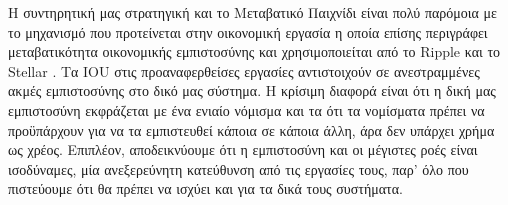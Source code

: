   Η συντηρητική μας στρατηγική και το Μεταβατικό Παιχνίδι είναι πολύ παρόμοια με το μηχανισμό που προτείνεται στην οικονομική
  εργασία \cite{iou} η οποία επίσης περιγράφει μεταβατικότητα οικονομικής εμπιστοσύνης και χρησιμοποιείται από το
  \textlatin{Ripple} \cite{ripple} και το \textlatin{Stellar} \cite{stellar}. Τα \textlatin{IOU} στις προαναφερθείσες εργασίες
  αντιστοιχούν σε ανεστραμμένες ακμές εμπιστοσύνης στο δικό μας σύστημα. Η κρίσιμη διαφορά είναι ότι η δική μας εμπιστοσύνη
  εκφράζεται με ένα ενιαίο νόμισμα και τα ότι τα νομίσματα πρέπει να προϋπάρχουν για να τα εμπιστευθεί κάποια σε κάποια άλλη,
  άρα δεν υπάρχει χρήμα ως χρέος. Επιπλέον, αποδεικνύουμε ότι η εμπιστοσύνη και οι μέγιστες ροές είναι ισοδύναμες, μία
  ανεξερεύνητη κατεύθυνση από τις εργασίες τους, παρ' όλο που πιστεύουμε ότι θα πρέπει να ισχύει και για τα δικά τους
  συστήματα.
